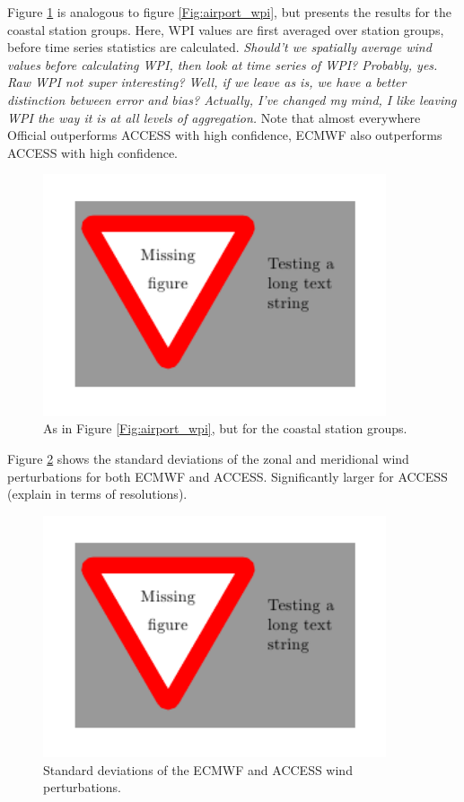\documentclass[alpha-refs]{wiley-article}
\begin{document}
Figure \ref{Fig:coastal_wpi} is analogous to figure \ref{Fig:airport_wpi}, but presents the results for the coastal station groups. Here, WPI values are first averaged over station groups, before time series statistics are calculated. \textit{Should't we spatially average wind values before calculating WPI, then look at time series of WPI? Probably, yes. Raw WPI not super interesting? Well, if we leave as is, we have a better distinction between error and bias? Actually, I've changed my mind, I like leaving WPI the way it is at all levels of aggregation.} Note that almost everywhere Official outperforms ACCESS with high confidence, ECMWF also outperforms ACCESS with high confidence. 

\begin{figure}
\centering
\includegraphics[keepaspectratio=true,width=0.90\textwidth]{figure_placeholder.png}
\caption{As in Figure \ref{Fig:airport_wpi}, but for the coastal station groups.}
\label{Fig:coastal_wpi}
\end{figure}

Figure \ref{Fig:std_perts_access_ecmwf} shows the standard deviations of the zonal and meridional wind perturbations for both ECMWF and ACCESS. Significantly larger for ACCESS (explain in terms of resolutions). 

\begin{figure}
\centering
\includegraphics[keepaspectratio=true,width=0.90\textwidth]{figure_placeholder.png}
\caption{Standard deviations of the ECMWF and ACCESS wind perturbations.}
\label{Fig:std_perts_access_ecmwf}
\end{figure}
\end{document}
